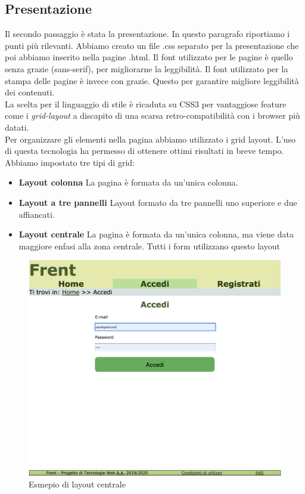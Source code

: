 \documentclass[1_relazione.tex]{subfiles}
\begin{document}
\subsection{Presentazione}
Il secondo passaggio \`{e} stata la presentazione. In questo paragrafo riportiamo i punti pi\`{u} rilevanti. Abbiamo creato un file .css separato per la presentazione che poi abbiamo inserito nella pagine .html. Il font utilizzato per le pagine \`{e} quello senza grazie (sans-serif), per migliorarne la leggibilit\`{a}. Il font utilizzato per la stampa delle pagine \`{e} invece con grazie. Questo per garantire migliore leggibilit\`{a} dei contenuti.  \\
La scelta per il linguaggio di stile è ricaduta su CSS3 per vantaggiose feature come i \textit{grid-layout} a discapito di una scarsa retro-compatibilità con i browser più datati.\\
Per organizzare gli elementi nella pagina abbiamo utilizzato i grid layout. L'uso di questa tecnologia ha permesso di ottenere ottimi risultati in breve tempo. Abbiamo impostato tre tipi di grid:
\begin{itemize}
\item \textbf{Layout colonna} La pagina è formata da un'unica colonna.
\item \textbf{Layout a tre pannelli} Layout formato da tre pannelli uno superiore e due affiancati.
\item \textbf{Layout centrale} La pagina è formata da un'unica colonna, ma viene data maggiore enfasi alla zona centrale. Tutti i form utilizzano questo layout
\end{itemize}

\begin{figure}[h!]
    \centering
    \includegraphics[scale=0.3]{immagini/LayoutCentrale.png}
    \caption{Esmepio di layout centrale}
\end{figure}
\end{document}
